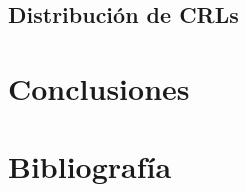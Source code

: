 \documentclass[a4paper]{article}
\begin{document}
\subsection{Distribución de CRLs}

\section{Conclusiones}

\section{Bibliografía}
\nocite{*}

\end{document}
